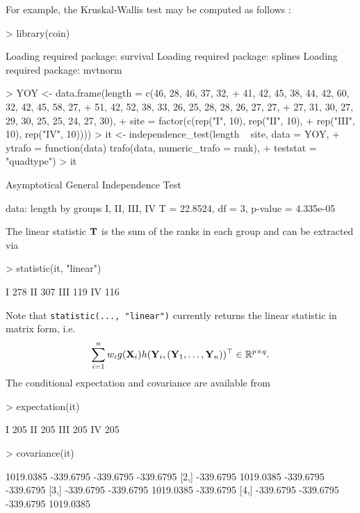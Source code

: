 \documentclass[letter]{article}
\begin{document}
For example, the Kruskal-Wallis test may be computed as follows
\citep[example taken from][Table 6.3, page 200]{HollanderWolfe1999}:

\begin{Schunk}
\begin{Sinput}
> library(coin)
\end{Sinput}
\begin{Soutput}
Loading required package: survival
Loading required package: splines
Loading required package: mvtnorm
\end{Soutput}
\begin{Sinput}
> YOY <- data.frame(length = c(46, 28, 46, 37, 32, 
+     41, 42, 45, 38, 44, 42, 60, 32, 42, 45, 58, 27, 
+     51, 42, 52, 38, 33, 26, 25, 28, 28, 26, 27, 27, 
+     27, 31, 30, 27, 29, 30, 25, 25, 24, 27, 30), 
+     site = factor(c(rep("I", 10), rep("II", 10), 
+         rep("III", 10), rep("IV", 10))))
> it <- independence_test(length ~ site, data = YOY, 
+     ytrafo = function(data) trafo(data, numeric_trafo = rank), 
+     teststat = "quadtype")
> it
\end{Sinput}
\begin{Soutput}
	Asymptotical General Independence Test

data:  length by groups I, II, III, IV 
T = 22.8524, df = 3, p-value = 4.335e-05
\end{Soutput}
\end{Schunk}
The linear statistic $\mathbf{T}$ is the sum of the ranks in each group and 
can be extracted via
\begin{Schunk}
\begin{Sinput}
> statistic(it, "linear")
\end{Sinput}
\begin{Soutput}
    [,1]
I    278
II   307
III  119
IV   116
\end{Soutput}
\end{Schunk}
Note that \texttt{statistic(..., "linear")} currently returns the linear
statistic in matrix form, i.e.
\begin{eqnarray*}
\sum_{i = 1}^n w_i g(\mathbf{X}_i) h(\mathbf{Y}_i, (\mathbf{Y}_1, \dots, \mathbf{Y}_n))^\top \in \mathbb{R}^{p
\times q}.
\end{eqnarray*}
The conditional expectation and covariance are available from
\begin{Schunk}
\begin{Sinput}
> expectation(it)
\end{Sinput}
\begin{Soutput}
    [,1]
I    205
II   205
III  205
IV   205
\end{Soutput}
\begin{Sinput}
> covariance(it)
\end{Sinput}
\begin{Soutput}
          [,1]      [,2]      [,3]      [,4]
[1,] 1019.0385 -339.6795 -339.6795 -339.6795
[2,] -339.6795 1019.0385 -339.6795 -339.6795
[3,] -339.6795 -339.6795 1019.0385 -339.6795
[4,] -339.6795 -339.6795 -339.6795 1019.0385
\end{Soutput}
\end{Schunk}
\end{document}
